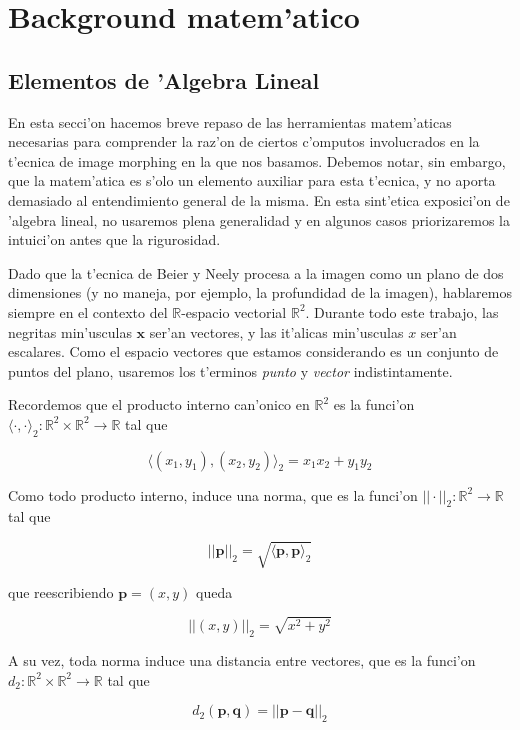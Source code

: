 \section{Background matem'atico}

\subsection{Elementos de 'Algebra Lineal}

En esta secci'on hacemos breve repaso de las herramientas matem'aticas necesarias para comprender la raz'on de ciertos c'omputos involucrados en la t'ecnica de image morphing en la que nos basamos. Debemos notar, sin embargo, que la matem'atica es s'olo un elemento auxiliar para esta t'ecnica, y no aporta demasiado al entendimiento general de la misma. En esta sint'etica exposici'on de 'algebra lineal, no usaremos plena generalidad y en algunos casos priorizaremos la intuici'on antes que la rigurosidad.

Dado que la t'ecnica de Beier y Neely procesa a la imagen como un plano de dos dimensiones (y no maneja, por ejemplo, la profundidad de la imagen), hablaremos siempre en el contexto del $\mathbb{R}$-espacio vectorial $\mathbb{R}^2$. Durante todo este trabajo, las negritas min'usculas $\mathbf{x}$ ser'an vectores, y las it'alicas min'usculas $x$ ser'an escalares. Como el espacio vectores que estamos considerando es un conjunto de puntos del plano, usaremos los t'erminos \textit{punto} y \textit{vector} indistintamente.

Recordemos que el producto interno can'onico en $\mathbb{R}^2$ es la funci'on $\langle \cdot, \cdot\rangle_2: \mathbb{R}^2 \times \mathbb{R}^2 \to \mathbb{R}$ tal que

\[\langle (x_1, y_1), (x_2, y_2)\rangle_2 = x_1 x_2 + y_1 y_2\]

\noindent
Como todo producto interno, induce una norma, que es la funci'on $||\cdot||_2:\mathbb{R}^2 \to \mathbb{R}$ tal que

\[||\mathbf{p}||_2 = \sqrt{\langle \mathbf{p}, \mathbf{p}\rangle_2}\]

\noindent
que reescribiendo $\mathbf{p} = (x, y)$ queda

\[||(x, y)||_2 = \sqrt{x^2 + y^2}\]

\noindent
A su vez, toda norma induce una distancia entre vectores, que es la funci'on $d_2:\mathbb{R}^2 \times \mathbb{R}^2 \to \mathbb{R}$ tal que 

\[d_2(\mathbf{p}, \mathbf{q}) = ||\mathbf{p} - \mathbf{q}||_2\]


